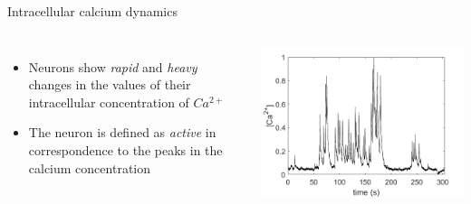 \documentclass{beamer}
\begin{document}
\begin{frame}{Intracellular calcium dynamics}

\begin{columns}
	\begin{itemize}
		\vspace{0.5cm}
		\item Neurons show \textit{rapid} and \textit{heavy} changes in the values of their intracellular concentration of $Ca^{2+}$
		
		\vspace{0.5cm}
		
		\item The neuron is defined as \textit{active} in correspondence to the peaks in the calcium concentration
		
		
		
	\end{itemize}
	\centering
	\includegraphics[scale=0.4]{ca_conc}
	
\end{columns}

\end{frame}
\end{document}
